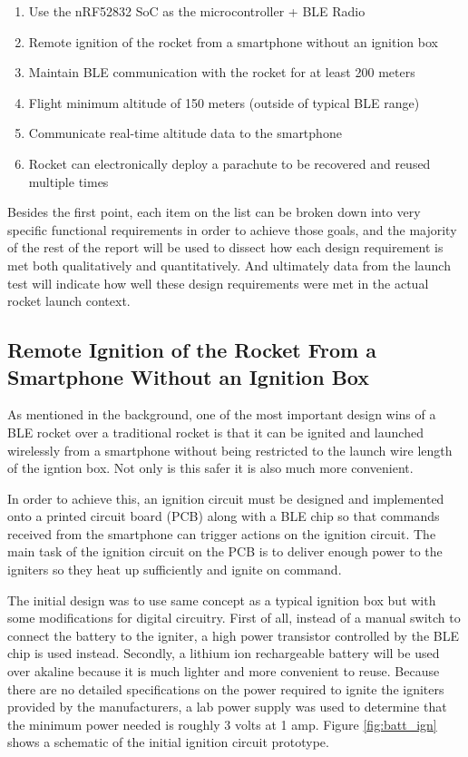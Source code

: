 \documentclass{workreport}
\begin{document}
\begin{body}
	\begin{enumerate}
	\item Use the nRF52832 SoC as the microcontroller + BLE Radio
  \item Remote ignition of the rocket from a smartphone without an ignition box
	\item Maintain BLE communication with the rocket for at least 200 meters
	\item Flight minimum altitude of 150 meters (outside of typical BLE range)
	\item Communicate real-time altitude data to the smartphone
	\item Rocket can electronically deploy a parachute to be recovered and reused multiple times
	\end{enumerate}

	Besides the first point, each item on the list can be broken down into very specific functional requirements in order to achieve those goals, and the majority of the rest of the report will be used to dissect how each design requirement is met both qualitatively and quantitatively. And ultimately data from the launch test will indicate how well these design requirements were met in the actual rocket launch context.

	\subsection{Remote Ignition of the Rocket From a Smartphone Without an Ignition Box}
	As mentioned in the background, one of the most important design wins of a BLE rocket over a traditional rocket is that it can be ignited and launched wirelessly from a smartphone without being restricted to the launch wire length of the igntion box. Not only is this safer it is also much more convenient.

	In order to achieve this, an ignition circuit must be designed and implemented onto a printed circuit board (PCB) along with a BLE chip so that commands received from the smartphone can trigger actions on the ignition circuit. The main task of the ignition circuit on the PCB is to deliver enough power to the igniters so they heat up sufficiently and ignite on command.

	The initial design was to use same concept as a typical ignition box but with some modifications for digital circuitry. First of all, instead of a manual switch to connect the battery to the igniter, a high power transistor controlled by the BLE chip is used instead. Secondly, a lithium ion rechargeable battery will be used over akaline because it is much lighter and more convenient to reuse. Because there are no detailed specifications on the power required to ignite the igniters provided by the manufacturers, a lab power supply was used to determine that the minimum power needed is roughly 3 volts at 1 amp. Figure \ref{fig:batt_ign} shows a schematic of the initial ignition circuit prototype.


\end{body}
\end{document}
